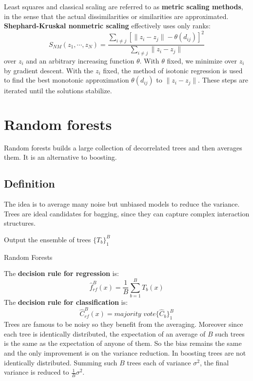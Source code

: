 \documentclass[12pt, letterpaper]{article}
\theoremstyle{definition}
\begin{document}
Least squares and classical scaling are referred to as \textbf{metric scaling methods}, in the sense that the actual dissimilarities or similarities are approximated. \textbf{Shephard-Kruskal nonmetric scaling} effectively uses only ranks:
\begin{equation}
S_{NM}(z_1, \cdots, z_N)  = \frac{\sum_{i\ne j} \left[ \|z_i - z_j\| - \theta(d_{ij})\right]^2}{\sum_{i\ne j}\|z_i - z_j\| }
\end{equation}
over $z_i$ and an arbitrary increasing function $\theta$. With $\theta$ fixed, we minimize over $z_i$ by gradient descent. With the $z_i$ fixed, the method of isotonic regression is used to find the best monotonic approximation $\theta(d_{ij})$ to $\|z_i - z_j \|$. These steps are iterated until the solutions stabilize.

\newpage
\section{Random forests}
Random forests builds a large collection of decorrelated trees and then averages them. It is an alternative to boosting.
\subsection{Definition}
The idea is to average many noise but unbiased models to reduce the variance. Trees are ideal candidates for bagging, since they can capture complex interaction structures.
\begin{algorithm}
Output the ensemble of trees $\{T_b\}_1^B$\;
\caption{Random Forests}
\end{algorithm}
The \textbf{decision rule for regression} is:
\begin{equation}
\hat{f}_{rf}^B(x) = \frac{1}{B}\sum_{b=1}^BT_b(x) 
\end{equation}
The \textbf{decision rule for classification} is:
\begin{equation}
\hat{C}_{rf}^B(x) = \textit{majority vote}\{\hat{C}_b\}_1^B
\end{equation}
Trees are famous to be noisy so they benefit from the averaging. Moreover since each tree is identically distributed, the expectation of an average of $B$ such trees is the same as the expectation of anyone of them. So the bias remains the same and the only improvement is on the variance reduction. In boosting trees are not identically distributed.
Summing such $B$ trees each of variance $\sigma^2$, the final variance is reduced to $\frac{1}{B}\sigma^2$. 
\end{document}

